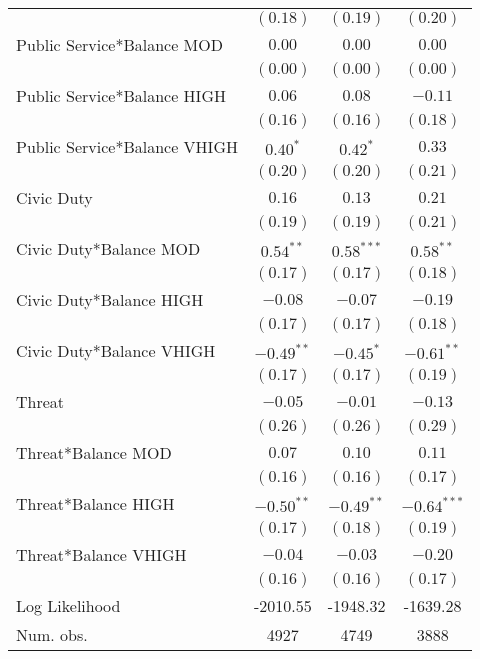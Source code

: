 \documentclass[12pt,titlepage]{article}
\begin{document}
\begin{center}
\begin{longtable}{| l | c |  c| c|}
                  & $(0.18)$      & $(0.19)$      & $(0.20)$      \\
Public Service*Balance MOD  & $0.00$        & $0.00$        & $0.00$        \\
                  & $(0.00)$      & $(0.00)$      & $(0.00)$      \\
Public Service*Balance HIGH  & $0.06$        & $0.08$        & $-0.11$       \\
                  & $(0.16)$      & $(0.16)$      & $(0.18)$      \\
Public Service*Balance VHIGH  & $0.40^{*}$    & $0.42^{*}$    & $0.33$        \\
                  & $(0.20)$      & $(0.20)$      & $(0.21)$      \\
Civic Duty              & $0.16$        & $0.13$        & $0.21$        \\
                  & $(0.19)$      & $(0.19)$      & $(0.21)$      \\
Civic Duty*Balance MOD   & $0.54^{**}$   & $0.58^{***}$  & $0.58^{**}$   \\
                  & $(0.17)$      & $(0.17)$      & $(0.18)$      \\
Civic Duty*Balance HIGH   & $-0.08$       & $-0.07$       & $-0.19$       \\
                  & $(0.17)$      & $(0.17)$      & $(0.18)$      \\
Civic Duty*Balance VHIGH   & $-0.49^{**}$  & $-0.45^{*}$   & $-0.61^{**}$  \\
                  & $(0.17)$      & $(0.17)$      & $(0.19)$      \\
Threat            & $-0.05$       & $-0.01$       & $-0.13$       \\
                  & $(0.26)$      & $(0.26)$      & $(0.29)$      \\
Threat*Balance MOD & $0.07$        & $0.10$        & $0.11$        \\
                  & $(0.16)$      & $(0.16)$      & $(0.17)$      \\
Threat*Balance HIGH & $-0.50^{**}$  & $-0.49^{**}$  & $-0.64^{***}$ \\
                  & $(0.17)$      & $(0.18)$      & $(0.19)$      \\
Threat*Balance VHIGH & $-0.04$       & $-0.03$       & $-0.20$       \\
                  & $(0.16)$      & $(0.16)$      & $(0.17)$      \\
\hline
Log Likelihood    & -2010.55      & -1948.32      & -1639.28      \\
Num. obs.         & 4927          & 4749          & 3888          \\
\end{longtable}
\end{center}
\end{document}
